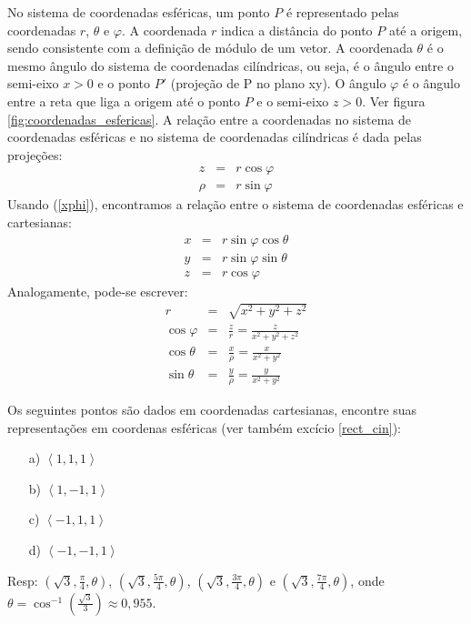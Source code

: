  No sistema de coordenadas esféricas, um ponto $P$ é representado pelas coordenadas $r$, $\theta$ e $\varphi$. A coordenada $r$ indica a distância do ponto $P$ até a origem, sendo consistente com a definição de módulo de um vetor. A coordenada $\theta$ é o mesmo ângulo do sistema de coordenadas cilíndricas, ou seja,  é o ângulo entre o semi-eixo $x>0$ e o ponto $P'$ (projeção de P no plano xy). O ângulo $\varphi$ é o ângulo entre a reta que liga a origem até o ponto $P$ e o semi-eixo $z>0$.  Ver figura \ref{fig:coordenadas_esfericas}. A relação entre a coordenadas no sistema de coordenadas esféricas e no sistema de coordenadas cilíndricas é dada pelas projeções:
\begin{subequations}
\begin{eqnarray}
z&=&r\cos\varphi\\
\rho&=&r\sin\varphi
\end{eqnarray}
\end{subequations}
Usando (\ref{xphi}), encontramos a relação entre o sistema de coordenadas esféricas e cartesianas:
\begin{subequations}
\begin{eqnarray}
x&=&r\sin\varphi\cos\theta\\
y&=&r\sin\varphi\sin\theta\\
z&=&r\cos\varphi
\end{eqnarray}
\end{subequations}
Analogamente, pode-se escrever:
\begin{subequations}
\begin{eqnarray}
r&=&\displaystyle \sqrt{x^2+y^2+z^2}\\
\cos\varphi&=&\displaystyle\frac{z}{r}=\frac{z}{x^2+y^2+z^2}\\
\cos\theta&=&\displaystyle\frac{x}{\rho}=\frac{x}{x^2+y^2}\\
\sin\theta&=&\displaystyle\frac{y}{\rho}=\frac{y}{x^2+y^2}
\end{eqnarray}
\end{subequations}


\begin{exer}\label{rect_esf} Os seguintes pontos são dados em coordenadas cartesianas, encontre suas representações em coordenas esféricas (ver também excício \ref{rect_cin}):
\begin{itemize}
\item [a)] $\left<1,1,1\right>$
\item [b)] $\left<1,-1,1\right>$
\item [c)] $\left<-1,1,1\right>$
\item [d)] $\left<-1,-1,1\right>$
\end{itemize}
\end{exer}
Resp: $\left(\sqrt{3},\frac{\pi}{4},\theta\right)$,  $\left(\sqrt{3},\frac{5\pi}{4},\theta\right)$, $\left(\sqrt{3},\frac{3\pi}{4},\theta\right)$ e  $\left(\sqrt{3},\frac{7\pi}{4},\theta\right)$, onde $\theta=\cos^{-1}\left(\frac{\sqrt{3}}{3}\right)\approx 0,955.$



